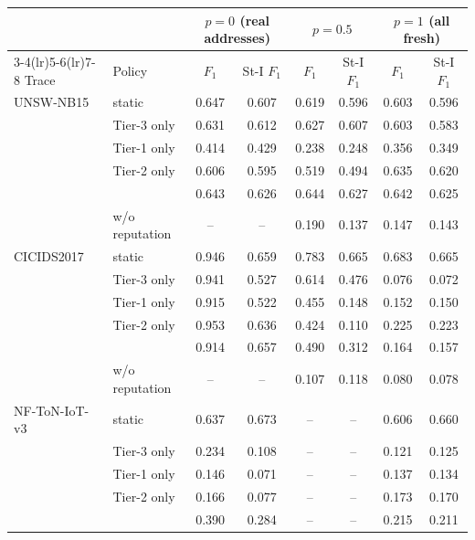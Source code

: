 \begin{tabular}{@{}llcccccc@{}}
\toprule
 & & \multicolumn{2}{c}{$p=0$ (real addresses)} & \multicolumn{2}{c}{$p=0.5$} & \multicolumn{2}{c}{$p=1$ (all fresh)} \\
\cmidrule(lr){3-4}\cmidrule(lr){5-6}\cmidrule(lr){7-8}
Trace & Policy & $F_1$ & St-I $F_1$ & $F_1$ & St-I $F_1$ & $F_1$ & St-I $F_1$ \\
\midrule
UNSW-NB15 & static & 0.647 & 0.607 & 0.619 & 0.596 & 0.603 & 0.596 \\
 & Tier-3 only & 0.631 & 0.612 & 0.627 & 0.607 & 0.603 & 0.583 \\
 & Tier-1 only & 0.414 & 0.429 & 0.238 & 0.248 & 0.356 & 0.349 \\
 & Tier-2 only & 0.606 & 0.595 & 0.519 & 0.494 & 0.635 & 0.620 \\
 & \drift{} & 0.643 & 0.626 & 0.644 & 0.627 & 0.642 & 0.625 \\
 & \drift{} w/o reputation & -- & -- & 0.190 & 0.137 & 0.147 & 0.143 \\
\midrule
CICIDS2017 & static & 0.946 & 0.659 & 0.783 & 0.665 & 0.683 & 0.665 \\
 & Tier-3 only & 0.941 & 0.527 & 0.614 & 0.476 & 0.076 & 0.072 \\
 & Tier-1 only & 0.915 & 0.522 & 0.455 & 0.148 & 0.152 & 0.150 \\
 & Tier-2 only & 0.953 & 0.636 & 0.424 & 0.110 & 0.225 & 0.223 \\
 & \drift{} & 0.914 & 0.657 & 0.490 & 0.312 & 0.164 & 0.157 \\
 & \drift{} w/o reputation & -- & -- & 0.107 & 0.118 & 0.080 & 0.078 \\
\midrule
NF-ToN-IoT-v3 & static & 0.637 & 0.673 & -- & -- & 0.606 & 0.660 \\
 & Tier-3 only & 0.234 & 0.108 & -- & -- & 0.121 & 0.125 \\
 & Tier-1 only & 0.146 & 0.071 & -- & -- & 0.137 & 0.134 \\
 & Tier-2 only & 0.166 & 0.077 & -- & -- & 0.173 & 0.170 \\
 & \drift{} & 0.390 & 0.284 & -- & -- & 0.215 & 0.211 \\
\bottomrule
\end{tabular}